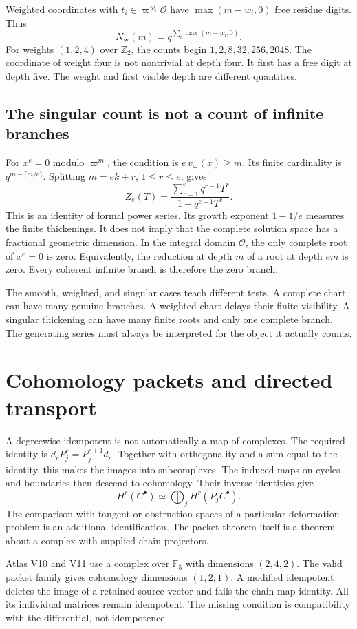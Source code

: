 Weighted coordinates with $t_i\in\varpi^{w_i}\mathcal O$ have
$\max(m-w_i,0)$ free residue digits. Thus
\[
 N_{\symbf{w}}(m)=q^{\sum_i\max(m-w_i,0)}.
\]
For weights $(1,2,4)$ over $\mathbb Z_2$, the counts begin
$1,2,8,32,256,2048$. The coordinate of weight four is not nontrivial at depth
four. It first has a free digit at depth five. The weight and first visible depth
are different quantities.

\subsection{The singular count is not a count of infinite branches}
For $x^e=0$ modulo $\varpi^m$, the condition is
$e\,v_\varpi(x)\ge m$. Its finite cardinality is
$q^{m-\lceil m/e\rceil}$. Splitting $m=ek+r$, $1\le r\le e$, gives
\[
 Z_e(T)=\frac{\sum_{r=1}^{e}q^{r-1}T^r}{1-q^{e-1}T^e}.
\]
This is an identity of formal power series. Its growth exponent $1-1/e$
measures the finite thickenings. It does not imply that the complete solution
space has a fractional geometric dimension. In the integral domain
$\mathcal O$, the only complete root of $x^e=0$ is zero. Equivalently, the
reduction at depth $m$ of a root at depth $em$ is zero. Every coherent infinite
branch is therefore the zero branch.

The smooth, weighted, and singular cases teach different tests. A complete chart
can have many genuine branches. A weighted chart delays their finite visibility.
A singular thickening can have many finite roots and only one complete branch.
The generating series must always be interpreted for the object it actually counts.

\clearpage
\section{Cohomology packets and directed transport}
A degreewise idempotent is not automatically a map of complexes. The required
identity is $d_rP_j^r=P_j^{r+1}d_r$. Together with orthogonality and a sum equal
to the identity, this makes the images into subcomplexes. The induced maps on
cycles and boundaries then descend to cohomology. Their inverse identities give
\[
 H^r(C^\bullet)\simeq\bigoplus_j H^r(P_jC^\bullet).
\]
The comparison with tangent or obstruction spaces of a particular deformation
problem is an additional identification. The packet theorem itself is a theorem
about a complex with supplied chain projectors.

Atlas V10 and V11 use a complex over $\mathbb F_5$ with dimensions $(2,4,2)$.
The valid packet family gives cohomology dimensions $(1,2,1)$. A modified
idempotent deletes the image of a retained source vector and fails the chain-map
identity. All its individual matrices remain idempotent. The missing condition
is compatibility with the differential, not idempotence.


